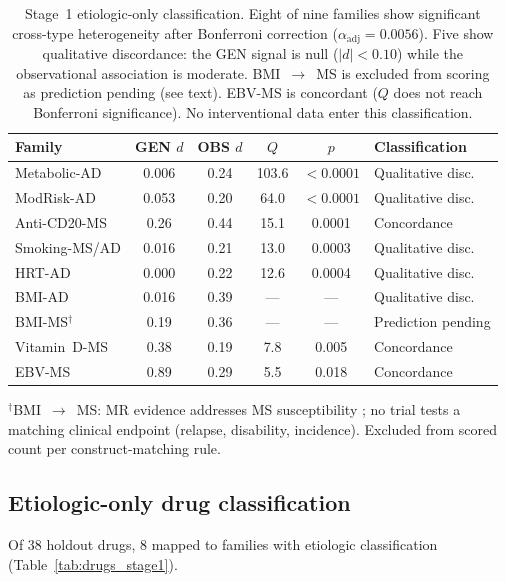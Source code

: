 \documentclass[11pt]{article}
\begin{document}
\begin{table}[t]
\centering
\caption{Stage~1 etiologic-only classification. Eight of nine families show significant cross-type heterogeneity after Bonferroni correction ($\alpha_{\text{adj}} = 0.0056$). Five show qualitative discordance: the GEN signal is null ($|d| < 0.10$) while the observational association is moderate. BMI~$\to$~MS is excluded from scoring as prediction pending (see text). EBV-MS is concordant ($Q$ does not reach Bonferroni significance). No interventional data enter this classification.}
\label{tab:stage1}
\begin{tabular}{lccccl}
\toprule
Family & GEN $d$ & OBS $d$ & $Q$ & $p$ & Classification \\
\midrule
Metabolic-AD & 0.006 & 0.24 & 103.6 & $< 0.0001$ & Qualitative disc. \\
ModRisk-AD & 0.053 & 0.20 & 64.0 & $< 0.0001$ & Qualitative disc. \\
Anti-CD20-MS & 0.26 & 0.44 & 15.1 & 0.0001 & Concordance \\
Smoking-MS/AD & 0.016 & 0.21 & 13.0 & 0.0003 & Qualitative disc. \\
HRT-AD & 0.000 & 0.22 & 12.6 & 0.0004 & Qualitative disc. \\
BMI-AD & 0.016 & 0.39 & --- & --- & Qualitative disc. \\
BMI-MS$^\dagger$ & 0.19 & 0.36 & --- & --- & Prediction pending \\
Vitamin~D-MS & 0.38 & 0.19 & 7.8 & 0.005 & Concordance \\
EBV-MS & 0.89 & 0.29 & 5.5 & 0.018 & Concordance \\
\bottomrule
\end{tabular}

\vspace{1mm}
{\footnotesize $^\dagger$BMI~$\to$~MS: MR evidence addresses MS susceptibility \citep{mokry2016obesity}; no trial tests a matching clinical endpoint (relapse, disability, incidence). Excluded from scored count per construct-matching rule.}
\end{table}

\subsection{Etiologic-only drug classification}

Of 38 holdout drugs, 8 mapped to families with etiologic classification (Table~\ref{tab:drugs_stage1}).
\end{document}
